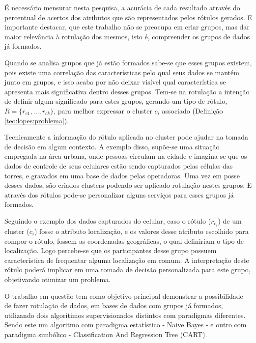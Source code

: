 É necessário mensurar nesta pesquisa, a acurácia de cada resultado através do percentual de acertos dos atributos que são representados pelos rótulos gerados. E importante destacar, que este trabalho não se preocupa em criar grupos, mas dar maior relevância à rotulação dos mesmos, isto é, compreender os grupos de dados já formados.

Quando se analisa grupos que já estão formados sabe-se que esses grupos existem, pois existe uma correlação das características pelo qual seus dados se mantém junto em grupos, e isso acaba por não deixar visível qual característica se apresenta mais significativa dentro desses grupos. Tem-se na rotulação a intenção de definir algum significado para estes grupos, gerando um tipo de rótulo, ${ R=\{ r_{c1},...,r_{ck} \} }$, para melhor expressar o cluster ${c_i}$ associado (Definição \ref{teo:lopes:problema}).

Tecnicamente a informação do rótulo aplicada no cluster pode ajudar na tomada de decisão em algum contexto. A exemplo disso, supõe-se uma situação empregada na área urbana, onde pessoas circulam na cidade e imagina-se que os dados de controle de seus celulares estão sendo capturados pelas células das torres, e gravados em uma base de dados pelas operadoras. Uma vez em posse desses dados, são criados clusters podendo ser aplicado rotulação nestes grupos. E através dos rótulos pode-se personalizar alguns serviços para esses grupos já formados. 

Seguindo o exemplo dos dados capturados do celular, caso o rótulo (${r_{c_i}}$) de um cluster (${c_i}$) fosse o  atributo localização, e os valores  desse atributo escolhido para compor o rótulo, fossem as coordenadas geográficas, o qual definiriam o tipo de localização. Logo percebe-se que os participantes desse grupo possuem característica de frequentar alguma localização em comum. A interpretação deste rótulo poderá implicar em uma tomada de decisão personalizada para este grupo, objetivando otimizar um problema.

O trabalho em questão tem como objetivo principal demonstrar a  possibilidade de fazer rotulação de dados, em bases de dados com grupos já formados, utilizando dois algoritimos supervisionados distintos com paradigmas diferentes. Sendo este um algoritmo com paradigma estatístico - Naive Bayes -  e outro com paradigma simbólico - Classification And Regression Tree (CART).
 

